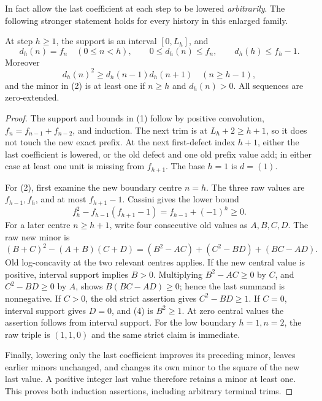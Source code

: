 In fact allow the last coefficient at each step to be lowered
\emph{arbitrarily}.  The following stronger statement holds for
every history in this enlarged family.
\begin{lemma}
At step $h\ge1$, the support is an interval $[0,L_h]$, and
\[
 d_h(n)=f_n\quad(0\le n<h),\qquad
 0\le d_h(n)\le f_n,\qquad d_h(h)\le f_h-1.                 \tag{1}
\]
Moreover
\[
 d_h(n)^2\ge d_h(n-1)d_h(n+1)\quad(n\ge h-1),             \tag{2}
\]
and the minor in (2) is at least one if $n\ge h$ and
$d_h(n)>0$.  All sequences are zero-extended.
\end{lemma}
\begin{proof}
The support and bounds in (1) follow by positive convolution,
$f_n=f_{n-1}+f_{n-2}$, and induction.  The next trim is at
$L_h+2\ge h+1$, so it does not touch the new exact prefix.
At the next first-defect index $h+1$, either the last coefficient
is lowered, or the old defect and one old prefix value add;
in either case at least one unit is missing from $f_{h+1}$.
The base $h=1$ is $d=(1)$.

For (2), first examine the new boundary centre $n=h$.
The three raw values are $f_{h-1},f_h$, and at most $f_{h+1}-1$.
Cassini gives the lower bound
\[
 f_h^2-f_{h-1}(f_{h+1}-1)
       =f_{h-1}+(-1)^h\ge0.                              \tag{3}
\]
For a later centre $n\ge h+1$, write four consecutive old values
as $A,B,C,D$.  The raw new minor is
\[
 (B+C)^2-(A+B)(C+D)
   =(B^2-AC)+(C^2-BD)+(BC-AD).                           \tag{4}
\]
Old log-concavity at the two relevant centres applies.  If the
new central value is positive, interval support implies $B>0$.
Multiplying $B^2-AC\ge0$ by $C$, and $C^2-BD\ge0$ by $A$,
shows $B(BC-AD)\ge0$; hence the last summand is nonnegative.
If $C>0$, the old strict assertion gives $C^2-BD\ge1$.
If $C=0$, interval support gives $D=0$, and (4) is $B^2\ge1$.
At zero central values the assertion follows from interval support.
For the low boundary $h=1,n=2$, the raw triple is $(1,1,0)$
and the same strict claim is immediate.

Finally, lowering only the last coefficient improves its preceding
minor, leaves earlier minors unchanged, and changes its own minor
to the square of the new last value.  A positive integer last value
therefore retains a minor at least one.  This proves both induction
assertions, including arbitrary terminal trims.
\end{proof}

